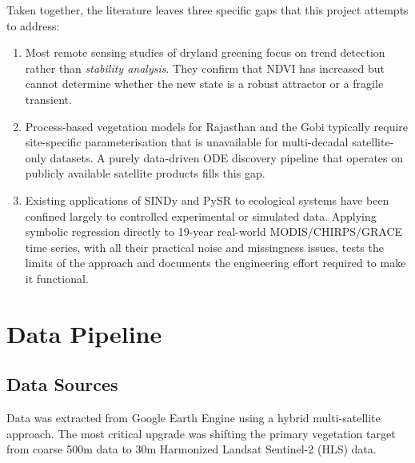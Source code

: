 \documentclass[12pt, a4paper]{article}
\begin{document}
Taken together, the literature leaves three specific gaps that this project attempts to address:
\begin{enumerate}[leftmargin=1.6em]
    \item Most remote sensing studies of dryland greening focus on trend detection rather than \emph{stability analysis}. They confirm that NDVI has increased but cannot determine whether the new state is a robust attractor or a fragile transient.
    \item Process-based vegetation models for Rajasthan and the Gobi typically require site-specific parameterisation that is unavailable for multi-decadal satellite-only datasets. A purely data-driven ODE discovery pipeline that operates on publicly available satellite products fills this gap.
    \item Existing applications of SINDy and PySR to ecological systems have been confined largely to controlled experimental or simulated data. Applying symbolic regression directly to 19-year real-world MODIS/CHIRPS/GRACE time series, with all their practical noise and missingness issues, tests the limits of the approach and documents the engineering effort required to make it functional.
\end{enumerate}

\section{Data Pipeline}
\label{sec:data}

\subsection{Data Sources}

Data was extracted from Google Earth Engine \cite{gorelick2017} using a hybrid multi-satellite approach. The most critical upgrade was shifting the primary vegetation target from coarse 500m data to 30m Harmonized Landsat Sentinel-2 (HLS) data.
\end{document}

